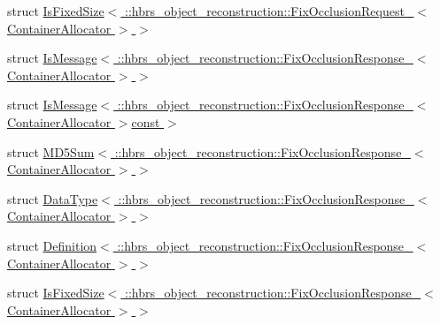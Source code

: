 \begin{DoxyCompactItemize}
\item 
struct \hyperlink{structros_1_1message__traits_1_1_is_fixed_size_3_01_1_1hbrs__object__reconstruction_1_1_fix_occlc5523a27954613b7d9067864be463d85}{\-Is\-Fixed\-Size$<$ \-::hbrs\-\_\-object\-\_\-reconstruction\-::\-Fix\-Occlusion\-Request\-\_\-$<$ Container\-Allocator $>$ $>$}
\item 
struct \hyperlink{structros_1_1message__traits_1_1_is_message_3_01_1_1hbrs__object__reconstruction_1_1_fix_occlusia33e907b44b81b8b61374e1ed374fdc9}{\-Is\-Message$<$ \-::hbrs\-\_\-object\-\_\-reconstruction\-::\-Fix\-Occlusion\-Response\-\_\-$<$ Container\-Allocator $>$ $>$}
\item 
struct \hyperlink{structros_1_1message__traits_1_1_is_message_3_01_1_1hbrs__object__reconstruction_1_1_fix_occlusif497e2f485247458a65dc28683cad1fb}{\-Is\-Message$<$ \-::hbrs\-\_\-object\-\_\-reconstruction\-::\-Fix\-Occlusion\-Response\-\_\-$<$ Container\-Allocator $>$const  $>$}
\item 
struct \hyperlink{structros_1_1message__traits_1_1_m_d5_sum_3_01_1_1hbrs__object__reconstruction_1_1_fix_occlusionf94b88f4ea6b60740cb70fc3946f1a3c}{\-M\-D5\-Sum$<$ \-::hbrs\-\_\-object\-\_\-reconstruction\-::\-Fix\-Occlusion\-Response\-\_\-$<$ Container\-Allocator $>$ $>$}
\item 
struct \hyperlink{structros_1_1message__traits_1_1_data_type_3_01_1_1hbrs__object__reconstruction_1_1_fix_occlusioac52ee242800123b4406fea61ab1dd66}{\-Data\-Type$<$ \-::hbrs\-\_\-object\-\_\-reconstruction\-::\-Fix\-Occlusion\-Response\-\_\-$<$ Container\-Allocator $>$ $>$}
\item 
struct \hyperlink{structros_1_1message__traits_1_1_definition_3_01_1_1hbrs__object__reconstruction_1_1_fix_occlusib5b6e66ca1ffd6b8ad6da8f01aae4908}{\-Definition$<$ \-::hbrs\-\_\-object\-\_\-reconstruction\-::\-Fix\-Occlusion\-Response\-\_\-$<$ Container\-Allocator $>$ $>$}
\item 
struct \hyperlink{structros_1_1message__traits_1_1_is_fixed_size_3_01_1_1hbrs__object__reconstruction_1_1_fix_occl7984e526a28db72ca98198e3bb18498a}{\-Is\-Fixed\-Size$<$ \-::hbrs\-\_\-object\-\_\-reconstruction\-::\-Fix\-Occlusion\-Response\-\_\-$<$ Container\-Allocator $>$ $>$}
\end{DoxyCompactItemize}
